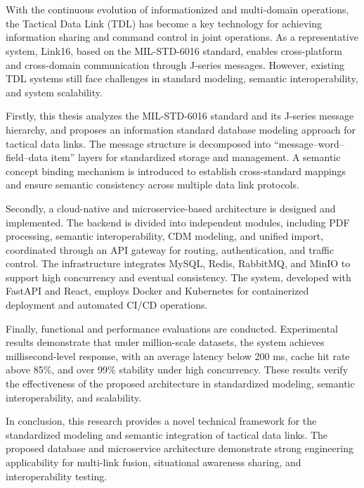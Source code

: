 \newpage
\vspace{-1cm}
\chapter*{}
\vspace{-0.5cm}

With the continuous evolution of informationized and multi-domain operations, the Tactical Data Link (TDL) has become a key technology for achieving information sharing and command control in joint operations. As a representative system, {Link16}, based on the MIL-STD-6016 standard, enables cross-platform and cross-domain communication through J-series messages. However, existing TDL systems still face challenges in standard modeling, semantic interoperability, and system scalability.

Firstly, this thesis analyzes the MIL-STD-6016 standard and its J-series message hierarchy, and proposes an information standard database modeling approach for tactical data links. The message structure is decomposed into “message–word–field–data item” layers for standardized storage and management. A semantic concept binding mechanism is introduced to establish cross-standard mappings and ensure semantic consistency across multiple data link protocols.

Secondly, a cloud-native and microservice-based architecture is designed and implemented. The backend is divided into independent modules, including PDF processing, semantic interoperability, CDM modeling, and unified import, coordinated through an API gateway for routing, authentication, and traffic control. The infrastructure integrates MySQL, Redis, RabbitMQ, and MinIO to support high concurrency and eventual consistency. The system, developed with FastAPI and React, employs Docker and Kubernetes for containerized deployment and automated CI/CD operations.

Finally, functional and performance evaluations are conducted. Experimental results demonstrate that under million-scale datasets, the system achieves millisecond-level response, with an average latency below 200 ms, cache hit rate above 85\%, and over 99\% stability under high concurrency. These results verify the effectiveness of the proposed architecture in standardized modeling, semantic interoperability, and scalability.

In conclusion, this research provides a novel technical framework for the standardized modeling and semantic integration of tactical data links. The proposed database and microservice architecture demonstrate strong engineering applicability for multi-link fusion, situational awareness sharing, and interoperability testing.


